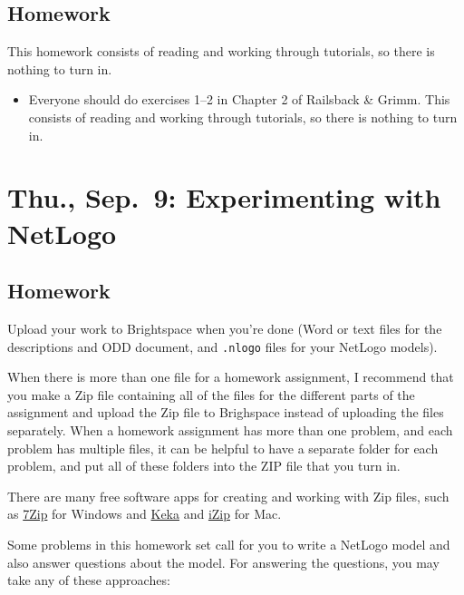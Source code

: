 \documentclass[
]{article}
\providecommand{\tightlist}{%
  \setlength{\itemsep}{0pt}\setlength{\parskip}{0pt}}
\begin{document}
\hypertarget{homework-2}{%
\subsection{Homework}\label{homework-2}}

This homework consists of reading and working through tutorials, so
there is nothing to turn in.

\begin{itemize}
\tightlist
\item
  Everyone should do exercises 1--2 in Chapter 2 of Railsback \& Grimm.
  This consists of reading and working through tutorials, so there is
  nothing to turn in.
\end{itemize}

\hypertarget{thu.-sep.-9-experimenting-with-netlogo}{%
\section{Thu., Sep.~9: Experimenting with
NetLogo}\label{thu.-sep.-9-experimenting-with-netlogo}}

\hypertarget{homework-3}{%
\subsection{Homework}\label{homework-3}}

Upload your work to Brightspace when you're done (Word or text files for
the descriptions and ODD document, and \texttt{.nlogo} files for your
NetLogo models).

When there is more than one file for a homework assignment, I recommend
that you make a Zip file containing all of the files for the different
parts of the assignment and upload the Zip file to Brighspace instead of
uploading the files separately. When a homework assignment has more than
one problem, and each problem has multiple files, it can be helpful to
have a separate folder for each problem, and put all of these folders
into the ZIP file that you turn in.

There are many free software apps for creating and working with Zip
files, such as \href{https://www.7-zip.org/}{7Zip} for Windows and
\href{https://www.keka.io/en/}{Keka} and
\href{https://www.izip.com}{iZip} for Mac.

Some problems in this homework set call for you to write a NetLogo model
and also answer questions about the model. For answering the questions,
you may take any of these approaches:
\end{document}
